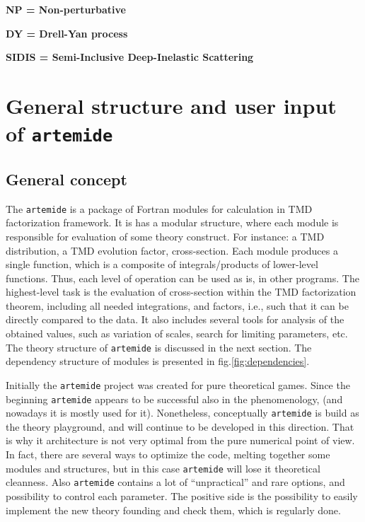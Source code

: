 \documentclass[prd,nofootinbib,eqsecnum,final]{revtex4}
\renewcommand{\(}{\left(}
\renewcommand{\)}{\right)}
\renewcommand{\[}{\left[}
\renewcommand{\]}{\right]}
\begin{document}
\textbf{NP = Non-perturbative}

\textbf{DY = Drell-Yan process}

\textbf{SIDIS = Semi-Inclusive Deep-Inelastic Scattering}

\newpage

\section{General structure and user input of \texttt{artemide}}

\subsection{General concept}

The \texttt{artemide} is a package of Fortran modules for calculation in TMD factorization framework. It is has a modular structure, where each module is responsible for evaluation of some theory construct. For instance: a TMD distribution, a TMD evolution factor, cross-section. Each module produces a single function, which is a composite of integrals/products of lower-level functions. Thus, each level of operation can be used as is, in other programs. The highest-level task is the evaluation of cross-section within the TMD factorization theorem, including all needed integrations, and factors, i.e., such that it can be directly compared to the data. It also includes several tools for analysis of the obtained values, such as variation of scales, search for limiting parameters, etc. The theory structure of \texttt{artemide} is discussed in the next section. The dependency structure of modules is presented in fig.\ref{fig:dependencies}.

Initially the \texttt{artemide} project was created for pure theoretical games. Since the beginning \texttt{artemide} appears to be successful also in the phenomenology, (and nowadays it is mostly used for it). Nonetheless, conceptually \texttt{artemide} is build as the theory playground, and will continue to be developed in this direction.  That is why it architecture is not very optimal from the pure numerical point of view. In fact, there are several ways to optimize the code, melting together some modules and structures, but in this case \texttt{artemide} will lose it theoretical cleanness. Also \texttt{artemide} contains a lot of ``unpractical'' and rare options, and possibility to control each parameter. The positive side is the possibility to easily implement the new theory founding and check them, which is regularly done.
\end{document}
